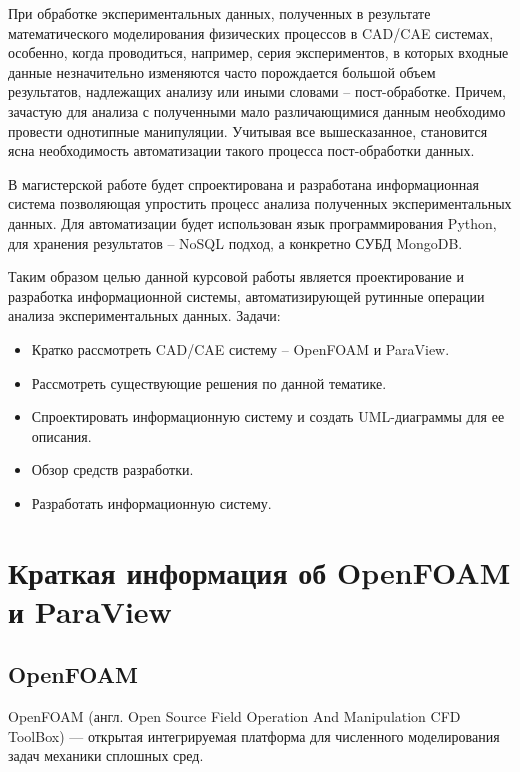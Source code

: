 \documentclass[14pt]{extreport}
\begin{document}
	\lstset{ %
		language=Python,                %
		numbers=left,                   %
		basicstyle=\footnotesize,
		inputencoding=utf8,
		extendedchars=\true
	}



\tableofcontents

\intro

При обработке экспериментальных данных, полученных в результате математического моделирования физических процессов в CAD/CAE системах, особенно, когда проводиться, например, серия экспериментов, в которых входные данные незначительно изменяются часто порождается большой объем результатов, надлежащих анализу или иными словами -- пост-обработке. Причем, зачастую для анализа с полученными мало различающимися данным необходимо провести однотипные манипуляции. Учитывая все вышесказанное, становится ясна необходимость автоматизации такого процесса пост-обработки данных. 

В магистерской работе будет спроектирована и разработана информационная система позволяющая упростить процесс анализа полученных экспериментальных данных. Для автоматизации будет использован язык программирования Python, для хранения результатов -- NoSQL подход, а конкретно СУБД MongoDB. 

Таким образом целью данной курсовой работы является проектирование и разработка информационной системы, автоматизирующей рутинные операции анализа экспериментальных данных.
Задачи:
\begin{itemize}
\item Кратко рассмотреть CAD/CAE систему -- OpenFOAM и ParaView.
\item Рассмотреть существующие решения по данной тематике.
\item Спроектировать информационную систему и создать UML-диаграммы для ее описания.
\item Обзор средств разработки.
\item Разработать информационную систему.
\end{itemize}

\chapter{Краткая информация об OpenFOAM и ParaView}
\section{OpenFOAM}
OpenFOAM (англ. Open Source Field Operation And Manipulation CFD ToolBox) — открытая интегрируемая платформа для численного моделирования задач механики сплошных сред. ~\cite{OpenfoamWiki}
\end{document}
